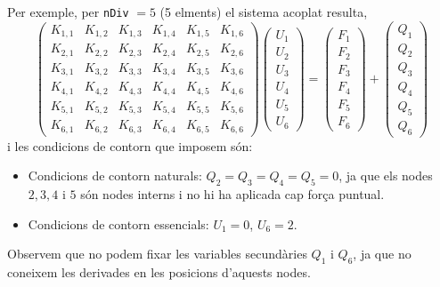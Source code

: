 \documentclass[aspectratio=169,xcolor=dvipsnames]{beamer}
\begin{document}
\begin{frame}
  \begin{block}{}\justifying
    Per exemple, per \texttt{nDiv} $=5$ (5 elments) el sistema acoplat
    resulta,
  \begin{equation}\label{eq:coupledSystem}
    \begin{pmatrix}
      K_{1,1} & K_{1,2} & K_{1,3} & K_{1,4} & K_{1,5} & K_{1,6} \\
      K_{2,1} & K_{2,2} & K_{2,3} & K_{2,4} & K_{2,5} & K_{2,6} \\
      K_{3,1} & K_{3,2} & K_{3,3} & K_{3,4} & K_{3,5} & K_{3,6} \\
      K_{4,1} & K_{4,2} & K_{4,3} & K_{4,4} & K_{4,5} & K_{4,6} \\ 
      K_{5,1} & K_{5,2} & K_{5,3} & K_{5,4} & K_{5,5} & K_{5,6} \\ 
      K_{6,1} & K_{6,2} & K_{6,3} & K_{6,4} & K_{6,5} & K_{6,6}   
    \end{pmatrix}
    \begin{pmatrix}
      U_{1}\\
      U_{2}\\
      U_{3}\\
      U_{4}\\
      U_{5}\\
      U_{6}
    \end{pmatrix} =
    \begin{pmatrix}
      F_{1}\\
      F_{2}\\
      F_{3}\\
      F_{4}\\
      F_{5}\\
      F_{6}
    \end{pmatrix} +
    \begin{pmatrix}
      Q_{1}\\
      Q_{2}\\
      Q_{3}\\
      Q_{4}\\
      Q_{5}\\
      Q_{6}
    \end{pmatrix}
  \end{equation}
i les condicions de contorn que imposem són:
\begin{itemize}
  \item Condicions de contorn naturals: $Q_{2} = Q_{3} = Q_{4} = Q_{5} =
    0$, ja que els nodes $2,3,4$ i $5$ són nodes interns i no hi ha
    aplicada cap força puntual. 
  \item Condicions de contorn essencials: $U_{1} = 0$, $U_{6} = 2$.
\end{itemize}
Observem que no podem fixar les variables secundàries $Q_{1}$ i $Q_{6}$,
ja que no coneixem les derivades en les posicions d'aquests nodes.
\end{block}
\end{frame}
\end{document}

